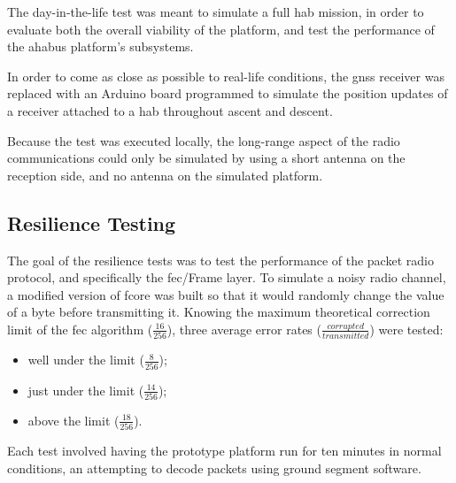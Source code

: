The day-in-the-life test was meant to simulate a full \acrshort{hab} mission,
in order to evaluate both the overall viability of the platform, and test the
performance of the \acrshort{ahabus} platform's subsystems.

In order to come as close as possible to real-life conditions, the
\acrshort{gnss} receiver was replaced with an Arduino board programmed to
simulate the position updates of a receiver attached to a \acrlong{hab}
throughout ascent and descent.

Because the test was executed locally, the long-range aspect of the radio
communications could only be simulated by using a short antenna on the reception
side, and no antenna on the simulated platform.

\subsection{Resilience Testing}
\label{ssec:method-resilience}

The goal of the resilience tests was to test the performance of the packet radio
protocol, and specifically the \acrlong{fec}/Frame layer. To simulate a noisy
radio channel, a modified version of \acrshort{fcore} was built so that it
would randomly change the value of a byte before transmitting it. Knowing the
maximum theoretical correction limit of the \acrshort{fec} algorithm
($\frac{16}{256}$), three average error rates
($\frac{corrupted}{transmitted}$) were tested:

\begin{itemize}
    \item well under the limit ($\frac{8}{256}$);
    \item just under the limit ($\frac{14}{256}$);
    \item above the limit ($\frac{18}{256}$).
\end{itemize}

Each test involved having the prototype platform run for ten minutes in normal
conditions, an attempting to decode packets using ground segment software.
